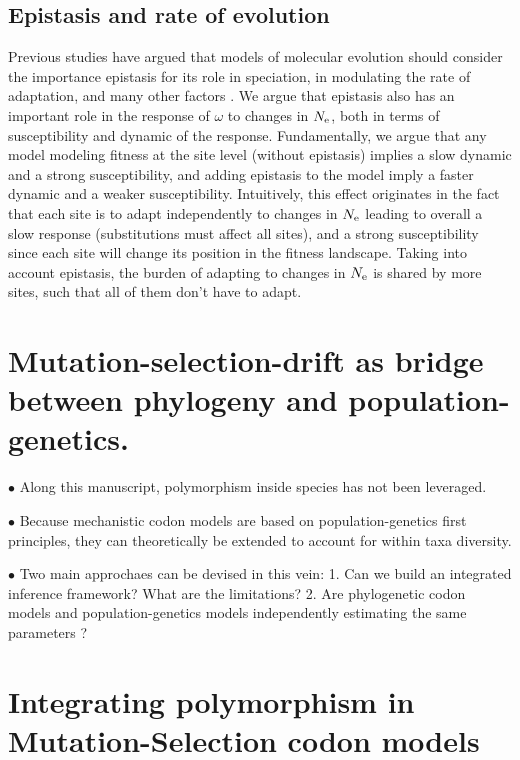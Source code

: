 \subsection{Epistasis and rate of evolution}

Previous studies have argued that models of molecular evolution should consider the importance epistasis for its role in speciation, in modulating the rate of adaptation, and many other factors \citep{Goldstein2017, Miller2018}.
We argue that epistasis also has an important role in the response of $\omega$ to changes in $N_{\textrm{e}}$, both in terms of susceptibility and dynamic of the response.
Fundamentally, we argue that any model modeling fitness at the site level (without epistasis) implies a slow dynamic and a strong susceptibility, and adding epistasis to the model imply a faster dynamic and a weaker susceptibility.
Intuitively, this effect originates in the fact that each site is to adapt independently to changes in $N_{\textrm{e}}$ leading to overall a slow response (substitutions must affect all sites), and a strong susceptibility since each site will change its position in the fitness landscape.
Taking into account epistasis, the burden of adapting to changes in $N_{\textrm{e}}$ is shared by more sites, such that all of them don't have to adapt.


\section{Mutation-selection-drift as bridge between phylogeny and population-genetics.}

$\bullet$ Along this manuscript, polymorphism inside species has not been leveraged.

$\bullet$ Because mechanistic codon models are based on population-genetics first principles, they can theoretically be extended to account for within taxa diversity.

$\bullet$ Two main approchaes can be devised in this vein:
1. Can we build an integrated inference framework? What are the limitations?
2. Are phylogenetic codon models and population-genetics models independently estimating the same parameters ?

\section{Integrating polymorphism in Mutation-Selection codon models}


